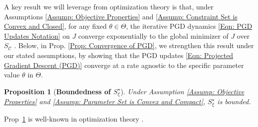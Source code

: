 \documentclass[letterpaper, 10 pt, conference]{ieeeconf}
\newcommand{\?}{\stackrel{?}{=}}
\newcommand{\obj}{J}
\newcommand{\param}{\theta}
\newcommand{\paramSet}{\Theta}
\newcommand{\var}{\xi}
\newcommand{\varOptSet}{S_\var^\star}
\newcommand{\proj}{\text{proj}}
\newcommand{\constraintSet}{{S_{\mathcal{C}}}}
\newtheorem{proposition}{Proposition}
\newcommand{\frank}[1]{{\textcolor[rgb]{0,0,1}{\textsf{[Frank: {#1}]}}}}
\newcommand{\antoine}[1]{{\textcolor[rgb]{1,0,0}{\textsf{[Antoine: {#1}]}}}}
\begin{document}

A key result we will leverage from optimization theory is that, under Assumptions \ref{Assump: Objective Properties} and \ref{Assump: Constraint Set is Convex and Closed}, for any fixed $\param \in \paramSet$, the iterative PGD dynamics \eqref{Eqn: PGD Updates Notation} on $\obj$
converge exponentially to the global minimizer of $\obj$ over $\constraintSet$ \cite[Sec. 7.3.3]{WrightRecht2022OptimizationForDataAnalysis}.
Below, in Prop. \ref{Prop: Convergence of PGD}, we strengthen this result under our stated assumptions, 
by showing that the PGD updates \eqref{Eqn: Projected Gradient Descent (PGD)} converge at a rate 
agnostic to the specific parameter value
$\param$ in $\paramSet$.


\begin{proposition}[\textbf{Boundedness of $\varOptSet$}]
\label{Prop: Minimizer Set is Bounded}
Under Assumption \ref{Assump: Objective Properties} and \ref{Assump: Parameter Set is Convex and Compact}, $\varOptSet$ is bounded.
\end{proposition}
Prop~\ref{Prop: Minimizer Set is Bounded} is well-known in optimization theory \cite[Sec. 2]{WrightRecht2022OptimizationForDataAnalysis}.
\end{document}
